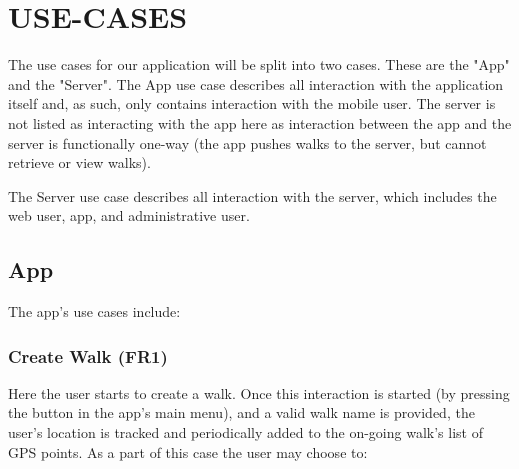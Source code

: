 \documentclass{project}
\begin{document}
\clearpage

\section{USE-CASES}

The use cases for our application will be split into two cases. These are the "App" and the "Server". The App use case describes all interaction with the application itself and, as such, only contains interaction with the mobile user. The server is not listed as interacting with the app here as interaction between the app and the server is functionally one-way (the app pushes walks to the server, but cannot retrieve or view walks).

The Server use case describes all interaction with the server, which includes the web 
user, app, and administrative user. 

\subsection{App}
\begin{figure}[H]
\end{figure}

\newpage

The app's use cases include: 

\subsubsection{Create Walk (FR1)}
Here the user starts to create a walk. Once this interaction is started 
(by pressing the button in the app's main menu), and a valid walk name is provided, 
the user's location is tracked and periodically added to the on-going walk's list of GPS points.\newline
As a part of this case the user may choose to: 
\end{document}
